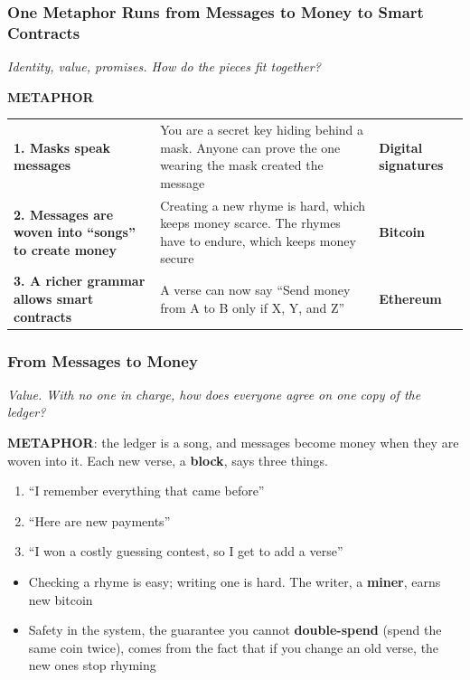 \documentclass[aspectratio=169]{beamer}
\newcommand{\lead}[1]{{\small\itshape\textcolor{gtnavy!80}{#1}}\par\vspace{1.5mm}}
\newcommand{\bi}{\begin{itemize}}
\newcommand{\ei}{\end{itemize}}
\newcommand{\m}{\item}
\newcommand{\be}{\begin{enumerate}}
\newcommand{\ee}{\end{enumerate}}
\begin{document}
\begin{frame}[label=main-metaphor]
\frametitle{One Metaphor Runs from Messages to Money to Smart Contracts}
\lead{Identity, value, promises. How do the pieces fit together?}

{\small\textcolor{gtred}{\textbf{METAPHOR}}}\par\vspace{2mm}
\renewcommand{\arraystretch}{1.6}
\begin{tabular}{@{}>{\raggedright\arraybackslash}p{}>{\raggedright\arraybackslash}p{}>{\raggedright\arraybackslash}p{}@{}}
\textbf{\textcolor{gtnavy}{1. Masks speak messages}} & You are a secret key hiding behind a mask. Anyone can prove the one wearing the mask created the message & \textbf{Digital signatures} \\
\textbf{\textcolor{gtnavy}{2. Messages are woven into ``songs'' to create money}} & Creating a new rhyme is hard, which keeps money scarce. The rhymes have to endure, which keeps money secure & \textbf{Bitcoin} \\
\textbf{\textcolor{gtnavy}{3. A richer grammar allows smart contracts}} & A verse can now say ``Send money from A to B only if X, Y, and Z'' & \textbf{Ethereum} \\
\end{tabular}
\par\vspace{0pt plus 1fill}\hfill{\scriptsize \hyperlink{appx-signature}{} \hyperlink{appx-key}{} \hyperlink{appx-sigformal}{} \hyperlink{appx-cyberweek}{}}
\end{frame}


\begin{frame}[label=main-verse]
\frametitle{From Messages to Money}
\lead{Value. With no one in charge, how does everyone agree on one copy of the ledger?}

\textcolor{gtred}{\textbf{METAPHOR}}: the ledger is a song, and messages become money when they are woven into it. Each new verse, a \textbf{block}, says three things.
\be
\m ``I remember everything that came before''
\m ``Here are new payments''
\m ``I won a costly guessing contest, so I get to add a verse''
\ee

\bi
\m Checking a rhyme is easy; writing one is hard. The writer, a \textbf{miner}, earns new bitcoin
\m Safety in the system, the guarantee you cannot \textbf{double-spend} (spend the same coin twice), comes from the fact that if you change an old verse, the new ones stop rhyming
\ei
\par\vspace{0pt plus 1fill}\hfill{\scriptsize \hyperlink{appx-hash}{} \hyperlink{appx-puzzle}{} \hyperlink{appx-merkle}{} \hyperlink{appx-supply}{} \hyperlink{appx-longest}{} \hyperlink{appx-majority}{}}
\end{frame}
\end{document}
